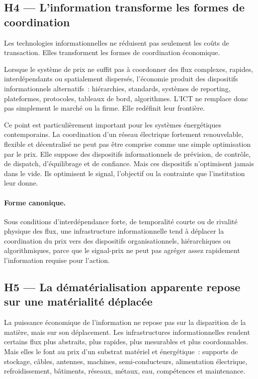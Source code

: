 \subsection{H4 --- L'information transforme les formes de coordination}

Les technologies informationnelles ne réduisent pas seulement les coûts de transaction. Elles transforment les formes de coordination économique.

Lorsque le système de prix ne suffit pas à coordonner des flux complexes, rapides, interdépendants ou spatialement dispersés, l'économie produit des dispositifs informationnels alternatifs~: hiérarchies, standards, systèmes de reporting, plateformes, protocoles, tableaux de bord, algorithmes. L'ICT ne remplace donc pas simplement le marché ou la firme. Elle redéfinit leur frontière.

Ce point est particulièrement important pour les systèmes énergétiques contemporains. La coordination d'un réseau électrique fortement renouvelable, flexible et décentralisé ne peut pas être comprise comme une simple optimisation par le prix. Elle suppose des dispositifs informationnels de prévision, de contrôle, de dispatch, d'équilibrage et de confiance. Mais ces dispositifs n'optimisent jamais dans le vide. Ils optimisent le signal, l'objectif ou la contrainte que l'institution leur donne.

\paragraph{Forme canonique.}
Sous conditions d'interdépendance forte, de temporalité courte ou de rivalité physique des flux, une infrastructure informationnelle tend à déplacer la coordination du prix vers des dispositifs organisationnels, hiérarchiques ou algorithmiques, parce que le signal-prix ne peut pas agréger assez rapidement l'information requise pour l'action.

\subsection{H5 --- La dématérialisation apparente repose sur une matérialité déplacée}

La puissance économique de l'information ne repose pas sur la disparition de la matière, mais sur son déplacement. Les infrastructures informationnelles rendent certains flux plus abstraits, plus rapides, plus mesurables et plus coordonnables. Mais elles le font au prix d'un substrat matériel et énergétique~: supports de stockage, câbles, antennes, machines, semi-conducteurs, alimentation électrique, refroidissement, bâtiments, réseaux, métaux, eau, compétences et maintenance.

